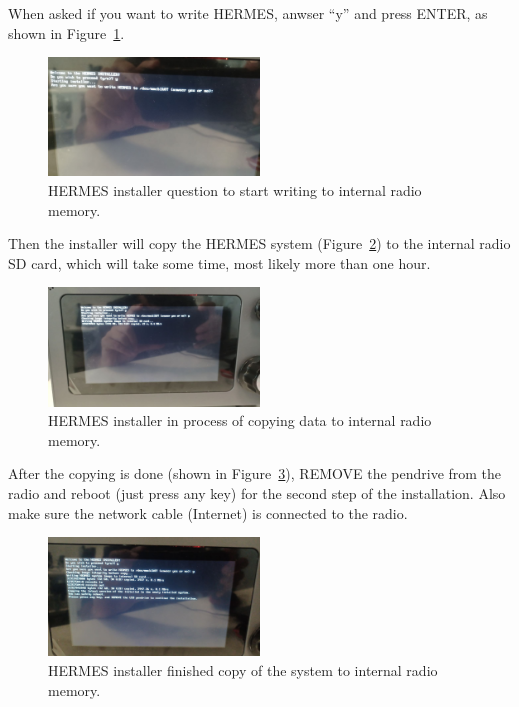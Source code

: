 \documentclass[11pt,a4paper]{article}
\begin{document}
When asked if you want to write HERMES, anwser ``y'' and press ENTER, as shown in Figure~\ref{fig:inst2}.

\begin{figure}[H]
  \centering
  \includegraphics[width=0.5\textwidth]{pictures/inst-2.jpg}
  \caption{HERMES installer question to start writing to internal radio memory.}
  \label{fig:inst2}
\end{figure}

Then the installer will copy the HERMES system (Figure~\ref{fig:inst3}) to the internal radio SD card, which will take some time, most likely more than one hour.

\begin{figure}[H]
  \centering
  \includegraphics[width=0.5\textwidth]{pictures/inst-3.jpg}
  \caption{HERMES installer in process of copying data to internal radio memory.}
  \label{fig:inst3}
\end{figure}

After the copying is done (shown in Figure~\ref{fig:inst4}), REMOVE the pendrive from the radio and reboot (just press any key)
for the second step of the installation. Also make sure the network cable (Internet) is connected to the radio.

\begin{figure}[H]
  \centering
  \includegraphics[width=0.5\textwidth]{pictures/inst-4.jpg}
  \caption{HERMES installer finished copy of the system to internal radio memory.}
  \label{fig:inst4}
\end{figure}
\end{document}
